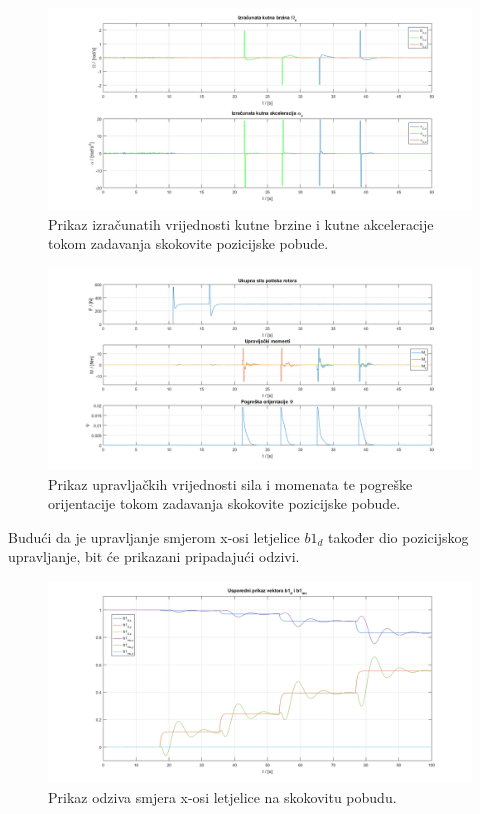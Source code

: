 \documentclass[times, utf8, diplomski]{fer}
\begin{document}
	\begin{figure}[!h]
		\includegraphics[width=\textwidth]{plots/pos_alpha_omega.png}
		\caption{Prikaz izračunatih vrijednosti kutne brzine i kutne  akceleracije  tokom zadavanja skokovite pozicijske pobude.}
	\end{figure}
	
	\begin{figure}[h!]
		\includegraphics[width=\textwidth]{plots/pos_force_moments.png}
		\caption{Prikaz upravljačkih vrijednosti sila i momenata te pogreške orijentacije tokom zadavanja skokovite pozicijske pobude.}
	\end{figure}
	
	Budući da je upravljanje smjerom x-osi letjelice $b1_d$ također dio pozicijskog upravljanje, bit će prikazani pripadajući odzivi.
	
	\newpage
	\clearpage
	
	\begin{figure}[h!]
		\includegraphics[width=\textwidth]{plots/b1d_b1d.png}
		\caption{Prikaz odziva smjera x-osi letjelice na skokovitu pobudu.}
	\end{figure}
\end{document}

